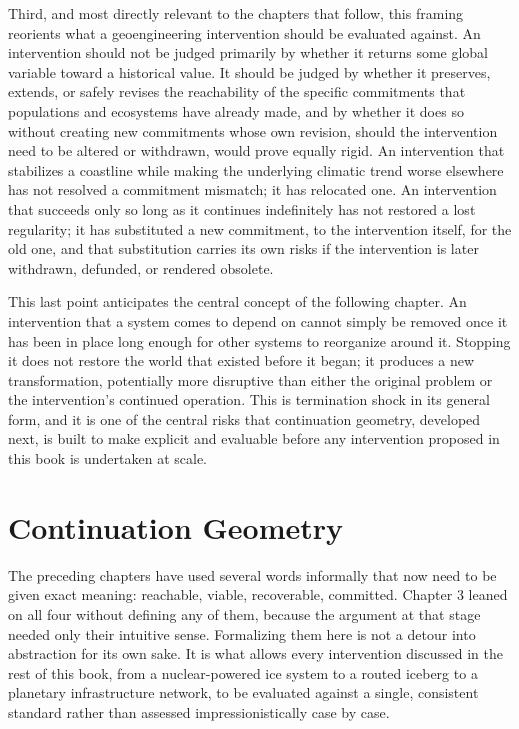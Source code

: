 \documentclass[11pt,oneside]{book}
\begin{document}
Third, and most directly relevant to the chapters that follow, this framing reorients what a geoengineering intervention should be evaluated against. An intervention should not be judged primarily by whether it returns some global variable toward a historical value. It should be judged by whether it preserves, extends, or safely revises the reachability of the specific commitments that populations and ecosystems have already made, and by whether it does so without creating new commitments whose own revision, should the intervention need to be altered or withdrawn, would prove equally rigid. An intervention that stabilizes a coastline while making the underlying climatic trend worse elsewhere has not resolved a commitment mismatch; it has relocated one. An intervention that succeeds only so long as it continues indefinitely has not restored a lost regularity; it has substituted a new commitment, to the intervention itself, for the old one, and that substitution carries its own risks if the intervention is later withdrawn, defunded, or rendered obsolete.

This last point anticipates the central concept of the following chapter. An intervention that a system comes to depend on cannot simply be removed once it has been in place long enough for other systems to reorganize around it. Stopping it does not restore the world that existed before it began; it produces a new transformation, potentially more disruptive than either the original problem or the intervention's continued operation. This is termination shock in its general form, and it is one of the central risks that continuation geometry, developed next, is built to make explicit and evaluable before any intervention proposed in this book is undertaken at scale.

\chapter{Continuation Geometry}

The preceding chapters have used several words informally that now need to be given exact meaning: reachable, viable, recoverable, committed. Chapter 3 leaned on all four without defining any of them, because the argument at that stage needed only their intuitive sense. Formalizing them here is not a detour into abstraction for its own sake. It is what allows every intervention discussed in the rest of this book, from a nuclear-powered ice system to a routed iceberg to a planetary infrastructure network, to be evaluated against a single, consistent standard rather than assessed impressionistically case by case.
\end{document}
